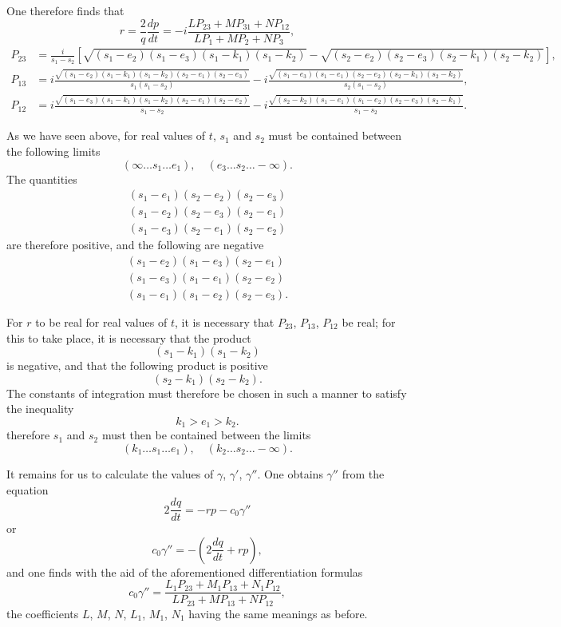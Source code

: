 \documentclass{article}
\begin{document}
One therefore finds that
\[
r = \frac{2}{q}\frac{dp}{dt} = -i\frac{LP_{23} + MP_{31} + NP_{12}}{LP_1 + MP_2 + NP_3},
\]
\begin{align*}
P_{23} &= \frac{i}{s_1 - s_2}\left[\sqrt{(s_1 - e_2)(s_1 - e_3)(s_1 - k_1)(s_1 - k_2)} - \sqrt{(s_2 - e_2)(s_2 - e_3)(s_2 - k_1)(s_2 - k_2)}\right], \\
P_{13} &= i\frac{\sqrt{(s_1 - e_2)(s_1 - k_1)(s_1 - k_2)(s_2 - e_1)(s_2 - e_3)}}{s_1\left(s_1 - s_2\right)} - i\frac{\sqrt{(s_1 - e_3)(s_1 - e_1)(s_2 - e_2)(s_2 - k_1)(s_2 - k_2)}}{s_2\left(s_1 - s_2\right)}, \\
P_{12} &= i\frac{\sqrt{(s_1 - e_3)(s_1 - k_1)(s_1 - k_2)(s_2 - e_1)(s_2 - e_2)}}{s_1 - s_2} - i\frac{\sqrt{(s_2 - k_2)(s_1 - e_1)(s_1 - e_2)(s_2 - e_3)(s_2 - k_1)}}{s_1 - s_2}.
\end{align*}

As we have seen above, for real values of $t$, $s_1$ and $s_2$ must be contained between the following limits
\[
(\infty \ldots s_1 \ldots e_1), \quad (e_3 \ldots s_2 \ldots -\infty).
\]
The quantities
\begin{gather*}
(s_1 - e_1)(s_2 - e_2)(s_2 - e_3) \\
(s_1 - e_2)(s_2 - e_3)(s_2 - e_1) \\
(s_1 - e_3)(s_2 - e_1)(s_2 - e_2)
\end{gather*}
are therefore positive, and the following are negative
\begin{gather*}
(s_1 - e_2)(s_1 - e_3)(s_2 - e_1) \\
(s_1 - e_3)(s_1 - e_1)(s_2 - e_2) \\
(s_1 - e_1)(s_1 - e_2)(s_2 - e_3).
\end{gather*}

For $r$ to be real for real values of $t$, it is necessary that $P_{23}$, $P_{13}$, $P_{12}$ be real; for this to take place, it is necessary that the product
\[
(s_1 - k_1)(s_1 - k_2)
\]
is negative, and that the following product is positive
\[
(s_2 - k_1)(s_2 - k_2).
\]
The constants of integration must therefore be chosen in such a manner to satisfy the inequality
\[
k_1 > e_1 > k_2.
\]
therefore $s_1$ and $s_2$ must then be contained between the limits
\[
(k_1 \ldots s_1 \ldots e_1), \quad (k_2 \ldots s_2 \ldots -\infty).
\]

It remains for us to calculate the values of $\gamma$, $\gamma'$, $\gamma''$.
One obtains $\gamma''$ from the equation
\[
2\frac{dq}{dt} = -rp - c_0\gamma''
\]
or
\[
c_0\gamma'' = -\left(2\frac{dq}{dt} + rp\right),
\]
and one finds with the aid of the aforementioned differentiation formulas
\[
c_0\gamma'' = \frac{L_1P_{23} + M_1P_{13} + N_1P_{12}}{LP_{23} + MP_{13} + NP_{12}},
\]
the coefficients $L$, $M$, $N$, $L_1$, $M_1$, $N_1$ having the same meanings as before.
\end{document}
